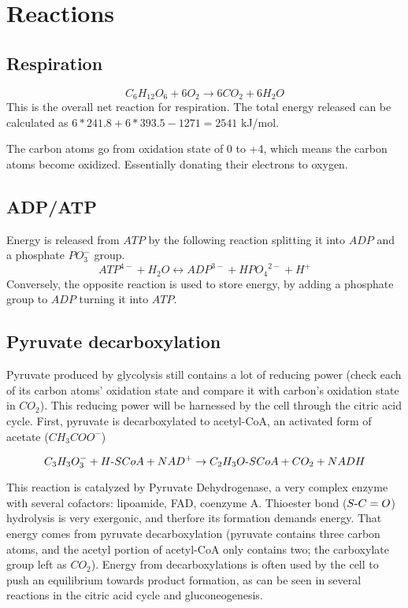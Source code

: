 \documentclass{article}
\def\mhyphen{{\hbox{-}}}
\begin{document}

\pagebreak
\section{Reactions}\label{sec_reactions}

\subsection{Respiration}
\[
    C_6H_{12}O_6 + 6O_2 \rightarrow 6CO_2 + 6H_2O
\]
This is the overall net reaction for respiration. The total energy released can be calculated as
$6*241.8 + 6*393.5 - 1271 = 2541$ kJ/mol.

The carbon atoms go from oxidation state of 0 to +4, which means the carbon atoms become
oxidized. Essentially donating their electrons to oxygen.

\subsection{ADP/ATP}
Energy is released from $ATP$ by the following reaction splitting it into $ADP$ and a
phosphate $PO_3^-$ group.
\[
    {ATP}^{4-} + H_2O \leftrightarrow {ADP}^{3-} + {HPO_4}^{2-} + H^+
\]
Conversely, the opposite reaction is used to store energy, by adding a phosphate group to
$ADP$ turning it into $ATP$.

\subsection{Pyruvate decarboxylation}
Pyruvate produced by glycolysis still contains a lot of reducing power (check each of its
carbon atoms' oxidation state and compare it with carbon's oxidation state in $CO_2$). This
reducing power will be harnessed by the cell through the citric acid cycle. First,
pyruvate is decarboxylated to acetyl-CoA, an activated form of acetate ($CH_3COO^-$)

\[
    C_3H_3O_3^- + H{\mhyphen}SCoA + NAD^+ \rightarrow
    C_2H_3O{\mhyphen}SCoA + CO_2 + NADH
\]

This reaction is catalyzed by Pyruvate Dehydrogenase, a very complex enzyme with several
cofactors: lipoamide, FAD, coenzyme A. Thioester bond ($S{\mhyphen}C=O$) hydrolysis is very exergonic,
and therfore its formation demands energy. That energy comes from pyruvate decarboxylation
(pyruvate contains three carbon atoms, and the acetyl portion of acetyl-CoA only contains
two; the carboxylate group left as $CO_2$). Energy from decarboxylations is often used by the
cell to push an equilibrium towards product formation, as can be seen in several reactions
in the citric acid cycle and gluconeogenesis.
\end{document}

